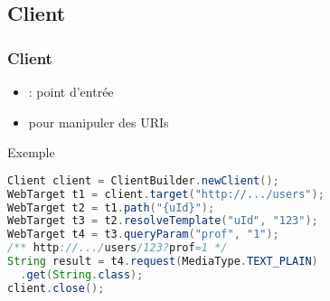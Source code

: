 \documentclass[english, french]{beamer}
\begin{document}
\subsection{Client}
\begin{frame}[fragile]
	\frametitle{Client}
	\begin{itemize}
		\item {} : point d’entrée
		\item {} pour manipuler des URIs
	\end{itemize}
	\begin{block}{Exemple}%
%		
		\begin{lstlisting}[language=Java, basicstyle=\small\NoAutoSpacing, aboveskip=0pt, belowskip=0pt]
Client client = ClientBuilder.newClient();
WebTarget t1 = client.target("http://.../users");
WebTarget t2 = t1.path("{uId}");
WebTarget t3 = t2.resolveTemplate("uId", "123");
WebTarget t4 = t3.queryParam("prof", "1");
/** http://.../users/123?prof=1 */
String result = t4.request(MediaType.TEXT_PLAIN)
  .get(String.class);
client.close();
		\end{lstlisting}
	\end{block}
\end{frame}
\end{document}
